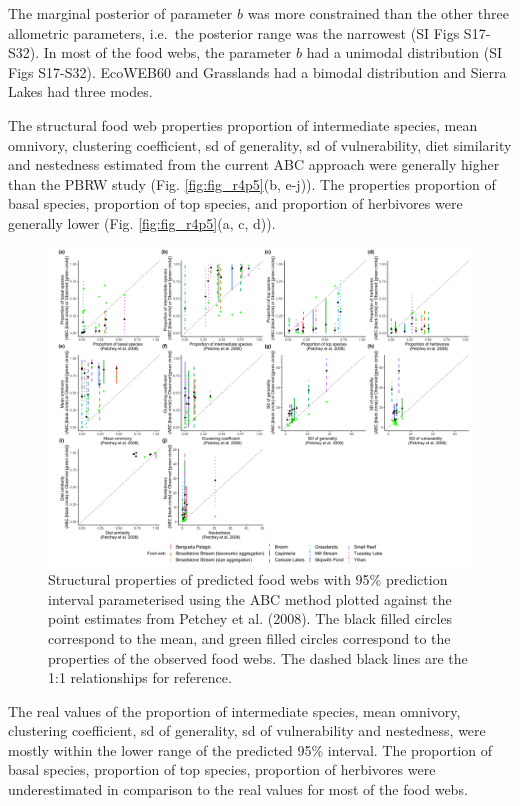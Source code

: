 \documentclass{article}
\begin{document}
The marginal posterior of parameter \(b\) was more constrained than the
other three allometric parameters, i.e.~the posterior range was the
narrowest (SI Figs S17-S32). In most of the food webs, the parameter
\(b\) had a unimodal distribution (SI Figs S17-S32). EcoWEB60 and
Grasslands had a bimodal distribution and Sierra Lakes had three modes.

The structural food web properties proportion of intermediate species,
mean omnivory, clustering coefficient, sd of generality, sd of
vulnerability, diet similarity and nestedness estimated from the current
ABC approach were generally higher than the PBRW study (Fig.
\ref{fig:fig_r4p5}(b, e-j)). The properties proportion of basal species,
proportion of top species, and proportion of herbivores were generally
lower (Fig. \ref{fig:fig_r4p5}(a, c, d)).

\begin{figure}

{\centering \includegraphics[width=500px]{fig/r_properties_ABC_vs_petchey_TSS_lower_a} 

}

\caption{\label{fig:fig_r4p5} Structural properties of predicted food webs with 95\% prediction interval parameterised using the ABC method plotted against the point estimates from Petchey et al. (2008). The black filled circles correspond to the mean, and green filled circles correspond to the properties of the observed food webs. The dashed black lines are the 1:1 relationships for reference.}\label{fig:unnamed-chunk-8}
\end{figure}

The real values of the proportion of intermediate species, mean
omnivory, clustering coefficient, sd of generality, sd of vulnerability
and nestedness, were mostly within the lower range of the predicted 95\%
interval. The proportion of basal species, proportion of top species,
proportion of herbivores were underestimated in comparison to the real
values for most of the food webs.
\end{document}
